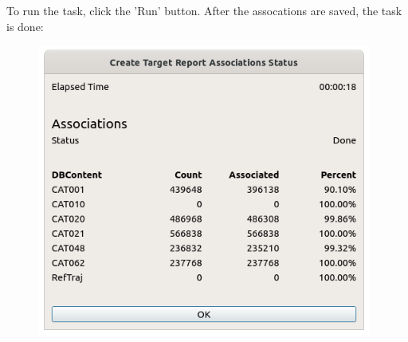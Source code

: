 To run the task, click the 'Run' button. After the assocations are saved, the task is done:

\begin{figure}[H]
  \center
    \includegraphics[width=11cm]{figures/tr_association_done.png}
\end{figure}
